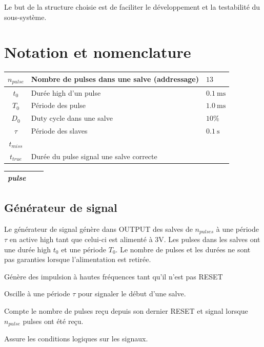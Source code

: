 \documentclass[french]{layout/Report}
\begin{document}
Le but de la structure choisie est de faciliter le développement et la testabilité
du sous-système.



\section{Notation et nomenclature}

\begin{center}
	\begin{tabular}{| c | l | l |}
		\hline
		$n_{pulse}$	& Nombre de pulses dans une salve (addressage) & $13$ \\ \hline
		$t_0$				& Durée high d'un pulse	& $\SI{0.1}{\milli\second}$	\\ \hline
		$T_0$				& Période des pulse	& $\SI{1.0}{\milli\second}$	\\ \hline
		$D_0$				& Duty cycle dans une salve & $10\%$	\\ \hline
		$\tau$			& Période des slaves	& $\SI{0.1}{\second}$\\ \hline
		$t_{miss}$  & &\\ \hline
		$t_{true}$  & Durée du pulse signal une salve correcte & \\ \hline
	\end{tabular}
\end{center}

\begin{center}
    \begin{tabular}{| c | l | c |}
			\hline
        \textit{pulse}      &  \\ \hline
    \end{tabular}
\end{center}

\subsection{Générateur de signal}
Le générateur de signal génère dans OUTPUT des salves de $n_{pulses}$ à une période $\tau$ en active high tant que celui-ci est alimenté à 3V. Les pulses dans les salves ont une durée high $t_0$ et une période $T_0$. Le nombre de pulses et les durées ne sont pas garanties lorsque l'alimentation est retirée.




\begin{description}[leftmargin=!,labelwidth=3cm, labelindent=\parindent]
	\item[Pulse timer] Génère des impulsion à hautes fréquences tant qu'il n'est pas RESET
	\item[Burst timer] Oscille à une période $\tau$ pour signaler le début d'une salve.
	\item[Decounter] Compte le nombre de pulses reçu depuis son dernier RESET et signal lorsque $n_{pulse}$ pulses ont été reçu.
	\item[Logic] Assure les conditions logiques sur les signaux.
\end{description}
\end{document}
